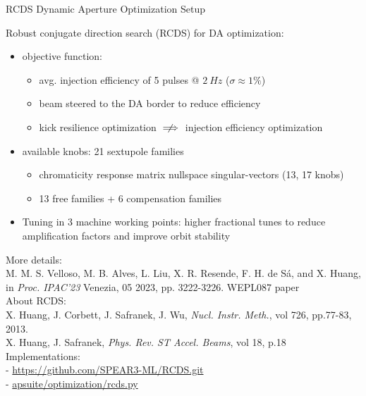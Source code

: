 \documentclass[aspectratio=169]{beamer}
\begin{document}
\begin{frame}{RCDS Dynamic Aperture Optimization Setup}
    \begin{minipage}{0.6\textwidth}
        \scriptsize
        Robust conjugate direction search (RCDS) for DA optimization:
        \begin{itemize}
        \item objective function:
        \begin{itemize}
            \scriptsize
            \item avg. injection efficiency of 5 pulses @ $\unit{2~Hz}$ ($\sigma\approx1\%$)
            \item beam steered to the DA border to reduce efficiency
            \item kick resilience optimization $\centernot\implies$ injection efficiency optimization
        \end{itemize}
        \item available knobs: 21 sextupole families
        \begin{itemize}
            \scriptsize
            \item chromaticity response matrix nullspace singular-vectors (13, 17 knobs)
            \item 13 free families + 6 compensation families
        \end{itemize}
        \item  Tuning in 3 machine working points: higher fractional tunes to reduce amplification factors and improve orbit stability
        \end{itemize}
        \vfill
        \tiny
        More details:\\
        M. M. S. Velloso, M. B. Alves,  L. Liu, X. R. Resende, F. H. de Sá, and X. Huang, in \emph{Proc. IPAC'23} Venezia, 05 2023, pp. 3222-3226. WEPL087 paper\\
        {\tiny About RCDS:\\
        X. Huang, J. Corbett, J. Safranek, J. Wu, \emph{Nucl. Instr. Meth.}, vol 726, pp.77-83, 2013.\\
        X. Huang, J. Safranek, \emph{Phys. Rev. ST Accel. Beams}, vol 18, p.18}\\
        {\tiny Implementations:\\
        - \url{https://github.com/SPEAR3-ML/RCDS.git}\\
        - \href{https://github.com/lnls-fac/apsuite/blob/7742d97c4af3d697ae11ce8961dc15579782288d/apsuite/optimization/rcds.py}{apsuite/optimization/rcds.py}}

\end{minipage}
\end{frame}
\end{document}
